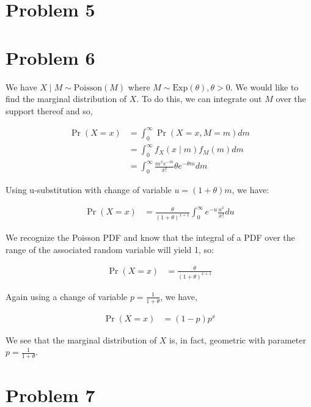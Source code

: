 \documentclass[11pt]{article}
\begin{document}
\section*{Problem 5}


\section*{Problem 6}

We have $X \mid M \sim \mathrm{Poisson}(M)$ where $M \sim
\mathrm{Exp}(\theta), \theta > 0$.  We would like to find the marginal
distribution of $X$.  To do this, we can integrate out $M$ over the
support thereof and so,

\begin{align*}
  \Pr{(X = x)} &= \int_0^{\infty} \Pr{(X=x,M=m)} dm \\
  &= \int_0^{\infty} f_X(x \mid m) f_M(m) dm \\
  &= \int_0^{\infty} \frac{m^x e^{-m}}{x!}
    \theta e^{-\theta m} dm
\end{align*}

Using u-substitution with change of variable $u = (1+\theta)m$, we
have:

\begin{align*}
  \Pr{(X=x)} &= \frac{\theta}{(1+\theta)^{x+1}} \int_0^{\infty} e^{-u}
               \frac{u^x}{x!} du
\end{align*}

We recognize the Poisson PDF and know that the integral of a PDF over
the range of the associated random variable will yield 1, so:

\begin{align*}
  \Pr{(X=x)} &= \frac{\theta}{(1+\theta)^{x+1}}
\end{align*}

Again using a change of variable $p = \frac{1}{1+\theta}$, we have,

\begin{align*}
  \Pr{(X=x)} &= (1-p)p^x
\end{align*}

We see that the marginal distribution of $X$ is, in fact, geometric with parameter $p =
\frac{1}{1+\theta}$.

\section*{Problem 7}
\end{document}
